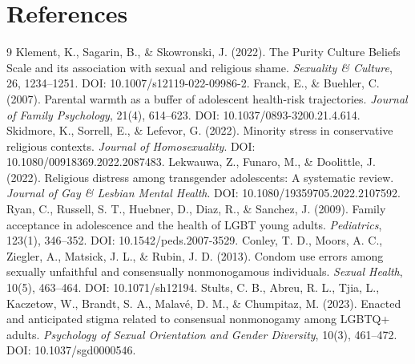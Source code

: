 \documentclass[12pt]{article}
\begin{document}
\section*{References}
\begin{thebibliography}{9}
 Klement, K., Sagarin, B., \& Skowronski, J. (2022). The Purity Culture Beliefs Scale and its association with sexual and religious shame. \textit{Sexuality \& Culture}, 26, 1234--1251. DOI: 10.1007/s12119-022-09986-2.
 Franck, E., \& Buehler, C. (2007). Parental warmth as a buffer of adolescent health-risk trajectories. \textit{Journal of Family Psychology}, 21(4), 614--623. DOI: 10.1037/0893-3200.21.4.614.
 Skidmore, K., Sorrell, E., \& Lefevor, G. (2022). Minority stress in conservative religious contexts. \textit{Journal of Homosexuality}. DOI: 10.1080/00918369.2022.2087483.
 Lekwauwa, Z., Funaro, M., \& Doolittle, J. (2022). Religious distress among transgender adolescents: A systematic review. \textit{Journal of Gay \& Lesbian Mental Health}. DOI: 10.1080/19359705.2022.2107592.
 Ryan, C., Russell, S. T., Huebner, D., Diaz, R., \& Sanchez, J. (2009). Family acceptance in adolescence and the health of LGBT young adults. \textit{Pediatrics}, 123(1), 346--352. DOI: 10.1542/peds.2007-3529.
 Conley, T. D., Moors, A. C., Ziegler, A., Matsick, J. L., \& Rubin, J. D. (2013). Condom use errors among sexually unfaithful and consensually nonmonogamous individuals. \textit{Sexual Health}, 10(5), 463--464. DOI: 10.1071/sh12194.
 Stults, C. B., Abreu, R. L., Tjia, L., Kaczetow, W., Brandt, S. A., Malavé, D. M., \& Chumpitaz, M. (2023). Enacted and anticipated stigma related to consensual nonmonogamy among LGBTQ+ adults. \textit{Psychology of Sexual Orientation and Gender Diversity}, 10(3), 461--472. DOI: 10.1037/sgd0000546.
\end{thebibliography}
\end{document}
